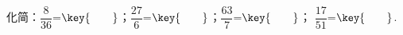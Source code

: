 化简：$\dfrac {8}{36}$=$\key{\qquad}$；$\dfrac {27}{6}$=$\key{\qquad}$；$\dfrac {63}{7}$=$\key{\qquad}$；
$\dfrac {17}{51}$=$\key{\qquad}$.